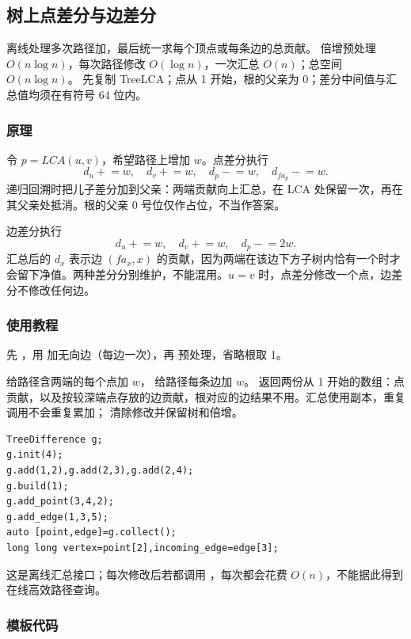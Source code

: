 \subsection{树上点差分与边差分}
\label{tree:difference}
\AlgorithmInfo
    {离线处理多次路径加，最后统一求每个顶点或每条边的总贡献。}
    {倍增预处理 $O(n\log n)$，每次路径修改 $O(\log n)$，一次汇总 $O(n)$；总空间 $O(n\log n)$。}
    {先复制 TreeLCA；点从 1 开始，根的父亲为 0；差分中间值与汇总值均须在有符号 64 位内。}
\subsubsection*{原理}
令 $p=LCA(u,v)$，希望路径上增加 $w$。点差分执行
\[
    d_u\mathrel{+}=w,\quad d_v\mathrel{+}=w,\quad
    d_p\mathrel{-}=w,\quad d_{fa_p}\mathrel{-}=w.
\]
递归回溯时把儿子差分加到父亲：两端贡献向上汇总，在 LCA 处保留一次，再在其父亲处抵消。根的父亲 0 号位仅作占位，不当作答案。

边差分执行
\[
    d_u\mathrel{+}=w,\quad d_v\mathrel{+}=w,\quad d_p\mathrel{-}=2w.
\]
汇总后的 $d_x$ 表示边 $(fa_x,x)$ 的贡献，因为两端在该边下方子树内恰有一个时才会留下净值。两种差分分别维护，不能混用。$u=v$ 时，点差分修改一个点，边差分不修改任何边。
\subsubsection*{使用教程}
先 ，用  加无向边（每边一次），再  预处理，省略根取 1。

 给路径含两端的每个点加 $w$， 给路径每条边加 $w$。 返回两份从 1 开始的数组：点贡献，以及按较深端点存放的边贡献，根对应的边结果不用。汇总使用副本，重复调用不会重复累加； 清除修改并保留树和倍增。
\begin{lstlisting}[style=mtycpp,numbers=none]
TreeDifference g;
g.init(4);
g.add(1,2),g.add(2,3),g.add(2,4);
g.build(1);
g.add_point(3,4,2);
g.add_edge(1,3,5);
auto [point,edge]=g.collect();
long long vertex=point[2],incoming_edge=edge[3];
\end{lstlisting}
这是离线汇总接口；每次修改后若都调用 ，每次都会花费 $O(n)$，不能据此得到在线高效路径查询。
\subsubsection*{模板代码}
